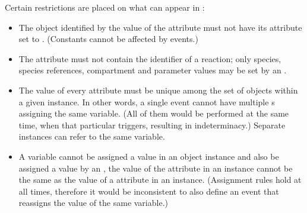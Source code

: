 Certain restrictions are placed on what can appear in
:
\begin{itemize}
  
\item The object identified by the value of the 
  attribute must not have its  attribute set 
  to .  (Constants cannot be affected by events.)
  
\item The  attribute must not contain the
  identifier of a reaction;  only species, species references,
  compartment and parameter values may be set by an \Event.
  
\item The value of every  attribute must be unique
  among the set of \EventAssignment objects within a given
  \Event instance.  In other words, a single event cannot have
  multiple \EventAssignment{}s assigning the same variable.  (All
  of them would be performed at the same time, when that
  particular \Event triggers, resulting in indeterminacy.)
  Separate \Event instances can refer to the same variable.
  
\item A variable cannot be assigned a value in an \EventAssignment
  object instance and also be assigned a value by an
  \AssignmentRule, \ie the value of the  attribute
  in an \EventAssignment instance cannot be the same as the value
  of a  attribute in an \AssignmentRule instance.
  (Assignment rules hold at all times, therefore it would be
  inconsistent to also define an event that reassigns the value of
  the same variable.)


\end{itemize}

